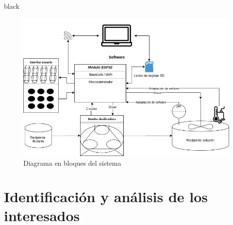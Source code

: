 \documentclass[11pt]{charter}
\begin{document}
\begin{consigna}{black}
\begin{figure}[htpb]
\centering 
\includegraphics[width=.8\textwidth]{./Figuras/diagBloques.jpg}
\caption{Diagrama en bloques del sistema}
\label{fig:diagBloques}
\end{figure}

\vspace{25px}

\end{consigna}


\section{Identificación y análisis de los interesados}
\label{sec:interesados}
\end{document}
